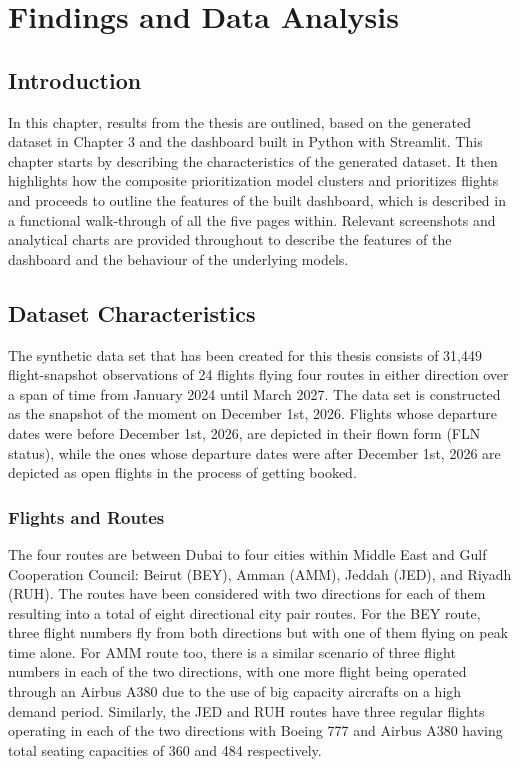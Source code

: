 \chapter{Findings and Data Analysis}
\label{ch:findings}

\section{Introduction}

In this chapter, results from the thesis are outlined, based on the generated dataset in Chapter 3 and the dashboard built in Python with Streamlit. This chapter starts by describing the characteristics of the generated dataset. It then highlights how the composite prioritization model clusters and prioritizes flights and proceeds to outline the features of the built dashboard, which is described in a functional walk-through of all the five pages within. Relevant screenshots and analytical charts are provided throughout to describe the features of the dashboard and the behaviour of the underlying models.

\section{Dataset Characteristics}

The synthetic data set that has been created for this thesis consists of 31,449 flight-snapshot observations of 24 flights flying four routes in either direction over a span of time from January 2024 until March 2027. The data set is constructed as the snapshot of the moment on December 1st, 2026. Flights whose departure dates were before December 1st, 2026, are depicted in their flown form (FLN status), while the ones whose departure dates were after December 1st, 2026 are depicted as open flights in the process of getting booked.

\subsection{Flights and Routes}

The four routes are between Dubai to four cities within Middle East and Gulf Cooperation Council: Beirut (BEY), Amman (AMM), Jeddah (JED), and Riyadh (RUH). The routes have been considered with two directions for each of them resulting into a total of eight directional city pair routes. For the BEY route, three flight numbers fly from both directions but with one of them flying on peak time alone. For AMM route too, there is a similar scenario of three flight numbers in each of the two directions, with one more flight being operated through an Airbus A380 due to the use of big capacity aircrafts on a high demand period. Similarly, the JED and RUH routes have three regular flights operating in each of the two directions with Boeing 777 and Airbus A380 having total seating capacities of 360 and 484 respectively.

